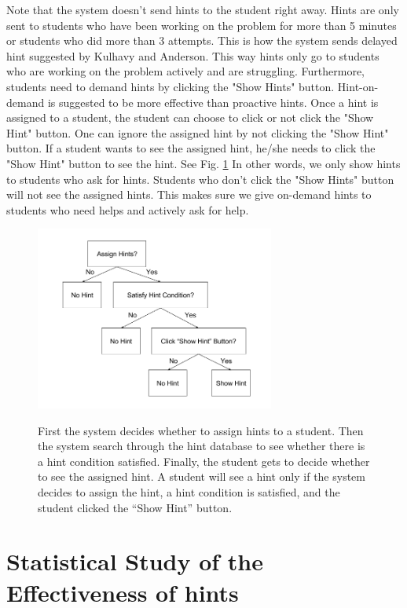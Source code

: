 \documentclass{llncs2e/llncs}
\begin{document}
Note that the system doesn't send hints to the student right away. Hints are only sent to students who have been working on the problem for more than 5 minutes or students who did more than 3 attempts. This is how the system sends delayed hint suggested by Kulhavy and Anderson\cite{Kulhavy1972}. This way hints only go to students who are working on the problem actively and are struggling. Furthermore, students need to demand hints by clicking the "Show Hints" button. Hint-on-demand is suggested to be more effective than proactive hints\cite{Razzaq2010}. Once a hint is assigned to a student, the student can choose to click or not click the "Show Hint" button. One can ignore the assigned hint by not clicking the "Show Hint" button. If a student wants to see the assigned hint, he/she needs to click the "Show Hint" button to see the hint. See Fig. \ref{fig:show_hint} In other words, we only show hints to students who ask for hints. Students who don't click the "Show Hints" button will not see the assigned hints. This makes sure we give on-demand hints to students who need helps and actively ask for help. 

\begin{figure}[ht]
   \centering
   \caption{First the system decides whether to assign hints to a student. Then the system search through the hint database to see whether there is a hint condition satisfied. Finally, the student gets to decide whether to see the assigned hint. A student will see a hint only if the system decides to assign the hint, a hint condition is satisfied, and the student clicked the ``Show Hint'' button.}
   \includegraphics[width=0.7\textwidth]{image/Show_Hint.png}
   \label{fig:show_hint}
\end{figure}


\section{Statistical Study of the Effectiveness of hints}
\end{document}
